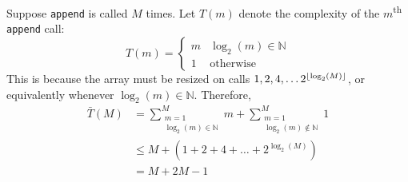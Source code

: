 \documentclass[mathserif, handout]{beamer}
\begin{document}
\begin{frame}
    \begin{thmbox}
    Suppose \texttt{append} is called $M$ times. Let $T(m)$ denote the complexity of the $m$\textsuperscript{th} \texttt{append} call:
        \[T(m) = \begin{cases} m & \log_2(m) \in \mathbb{N} \\ 1 & \text{otherwise}\end{cases}\]
            This is because the array must be resized on calls  $1, 2, 4, \dots 2^{\lfloor\log_2(M)\rfloor}$, or equivalently whenever $\log_2(m) \in \mathbb{N}$. Therefore,
            \begin{align*}
            \bar{T}(M) &= \sum_{\substack{m = 1 \\ \log_2(m) \in \mathbb{N}}}^{M}m + \sum_{\substack{m=1 \\ \log_2(m) \not\in \mathbb{N}}}^{M} 1\\
            &\leq M+\left(1+2+4+\dots+2^{{\log_2(M)}}\right) \\
            &= M+2M-1
            \end{align*}
    \end{thmbox}
\end{frame}
\end{document}

